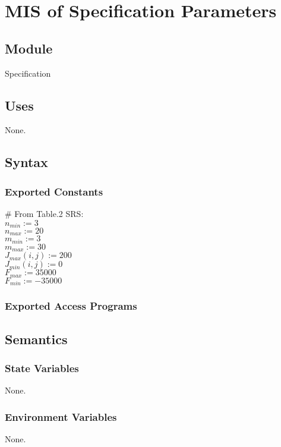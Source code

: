 \documentclass[12pt, titlepage]{article}
\begin{document}
\section{MIS of Specification Parameters \label{mSpec} }

\subsection{Module}

Specification

\subsection{Uses}
None.

\subsection{Syntax}

\subsubsection{Exported Constants}
$\#$ From Table.2 SRS: \\
$n_{min}:=3$\\
$n_{max}:=20$\\
$m_{min}:=3$\\
$m_{max}:=30$\\
$J_{max}(i,j):=200$\\
$J_{min}(i,j):=0$\\
$F_{max}:=35000$\\
$F_{min}:=-35000$\\



\subsubsection{Exported Access Programs}

\subsection{Semantics}
\subsubsection{State Variables}
None.

\subsubsection{Environment Variables}
None.
\end{document}
